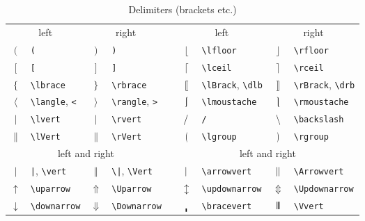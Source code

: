 \documentclass[captions=tableheading]{scrartcl}
\begin{document}
\begin{table}
  \caption{Delimiters (brackets etc.)}
  \label{tab:delimiters}
  \centering
  \begin{tabular}[c]{clclp{1pt}clcl}
    \toprule
    \multicolumn{2}{c}{left} & \multicolumn{2}{c}{right} & &
    \multicolumn{2}{c}{left} & \multicolumn{2}{c}{right} \\
    \cmidrule(lr){1-2} \cmidrule(lr){3-4}
    \cmidrule(lr){6-7} \cmidrule(lr){8-9}
    $($ & \verb|(| & $)$ & \verb|)| & &
    $\lfloor$ & \verb|\lfloor| & $\rfloor$ & \verb|\rfloor| \\
    $[$ & \verb|[| & $]$ & \verb|]| & &
    $\lceil$ & \verb|\lceil| & $\rceil$ & \verb|\rceil| \\
    $\lbrace$ & \verb|\lbrace| & $\rbrace$ & \verb|\rbrace| & &
    $\lBrack$ & \verb|\lBrack|, \verb|\dlb| & $\rBrack$ & \verb|\rBrack|, \verb|\drb| \\
    $\langle$ & \verb|\langle|, \verb|<| & $\rangle$ & \verb|\rangle|, \verb|>| & &
    $\lmoustache$ & \verb|\lmoustache| & $\rmoustache$ & \verb|\rmoustache| \\
    $\lvert$ & \verb|\lvert| & $\rvert$ & \verb|\rvert| & &
    $\left/\right.$ & \verb|/| & $\left.\right\backslash$ & \verb|\backslash| \\
    $\lVert$ & \verb|\lVert| & $\rVert$ & \verb|\rVert| & &
    $\lgroup$ & \verb|\lgroup| & $\rgroup$ & \verb|\rgroup| \\
    \midrule[\heavyrulewidth]
    \multicolumn{4}{c}{left and right} & & \multicolumn{4}{c}{left and right} \\
    \cmidrule(lr){1-4} \cmidrule(lr){6-9}
    $|$ & \verb/|/, \verb|\vert| & $\Vert$ & \verb/\|/, \verb|\Vert| & &
    $\arrowvert$ & \verb|\arrowvert| & $\Arrowvert$ & \verb|\Arrowvert| \\
    $\uparrow$ & \verb|\uparrow| & $\Uparrow$ & \verb|\Uparrow| & &
    $\updownarrow$ & \verb|\updownarrow| & $\Updownarrow$ & \verb|\Updownarrow| \\
    $\downarrow$ & \verb|\downarrow| & $\Downarrow$ & \verb|\Downarrow| & &
    $\bracevert$ & \verb|\bracevert| & $\Vvert$ & \verb|\Vvert| \\
    \bottomrule
  \end{tabular}
\end{table}
\end{document}

